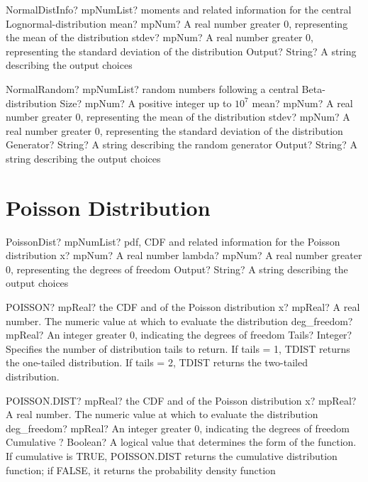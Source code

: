 \documentclass[12pt,a4paper,openany]{book}
\begin{document}
\begin{mpFunctionsExtract}
\mpFunctionThreeNotImplemented
{NormalDistInfo? mpNumList? moments and related information for the central Lognormal-distribution}
{mean? mpNum? A real number greater 0, representing the mean of the distribution}
{stdev? mpNum? A real number greater 0, representing the standard deviation of the distribution}
{Output? String? A string describing the output choices}
\end{mpFunctionsExtract}

\begin{mpFunctionsExtract}
\mpFunctionFiveNotImplemented
{NormalRandom? mpNumList? random numbers following a central Beta-distribution}
{Size? mpNum? A positive integer up to $10^7$}
{mean? mpNum? A real number greater 0, representing the mean of the distribution}
{stdev? mpNum? A real number greater 0, representing the standard deviation of the distribution}
{Generator? String? A string describing the random generator}
{Output? String? A string describing the output choices}
\end{mpFunctionsExtract}

\section{Poisson Distribution}

\begin{mpFunctionsExtract}
\mpFunctionThreeNotImplemented
{PoissonDist? mpNumList? pdf, CDF and related information for the Poisson distribution}
{x? mpNum? A real number}
{lambda? mpNum? A real number greater 0, representing the degrees of freedom}
{Output? String? A string describing the output choices}
\end{mpFunctionsExtract}

\begin{mpFunctionsExtract}
\mpWorksheetFunctionThreeNotImplemented
{POISSON? mpReal? the CDF and of the Poisson distribution}
{x? mpReal? A real number. The numeric value at which to evaluate the distribution}
{deg\_freedom? mpReal? An integer  greater 0, indicating the degrees of freedom}
{Tails? Integer? Specifies the number of distribution tails to return. If tails = 1, TDIST returns the one-tailed distribution. If tails = 2, TDIST returns the two-tailed distribution.}
\end{mpFunctionsExtract}

\begin{mpFunctionsExtract}
\mpWorksheetFunctionThreeNotImplemented
{POISSON.DIST? mpReal? the CDF and of the Poisson distribution}
{x? mpReal? A real number. The numeric value at which to evaluate the distribution}
{deg\_freedom? mpReal? An integer  greater 0, indicating the degrees of freedom}
{Cumulative ? Boolean? A logical value that determines the form of the function. If cumulative is TRUE, POISSON.DIST returns the cumulative distribution function; if FALSE, it returns the probability density function}
\end{mpFunctionsExtract}
\end{document}
